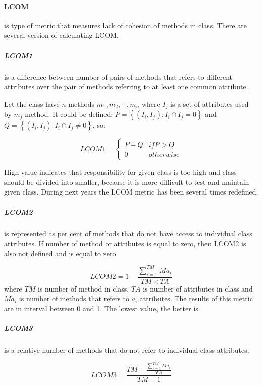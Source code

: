 \paragraph{\ac{LCOM}} is type of metric that measures lack of cohesion of methods in class. There are several version of calculating \ac{LCOM}.

\subparagraph*{LCOM1} is a difference between number of pairs of methods that refers to different attributes over the pair of methods referring to at least one common attribute. 

Let the class have $n$ methods $m_{1}, m_{2}, \cdots, m_{n}$ where $I_{j}$ is a set of attributes used by $m_{j}$ method. It could be defined: $P=\left\{ \left( { I }_{ i },{ I }_{ j } \right) :{ I }_{ i }\cap { I }_{ j }=0 \right\}$ and $Q=\left\{ \left( { I }_{ i },{ I }_{ j } \right) :{ I }_{ i }\cap { I }_{ j }\neq 0 \right\}$, so: 

\[LCOM1 = \left\{
  \begin{array}{lr}
    P-Q & if P>Q\\
    0 & otherwise
  \end{array}
\right.
\]

High value indicates that responsibility for given class is too high and class should be divided into smaller, because it is more difficult to test and maintain given class. During next years the \ac{LCOM} metric has been several times redefined. 

\subparagraph*{LCOM2} is represented as per cent of methods that do not have access to individual class attributes. If number of method or attributes is equal to zero, then LCOM2 is also not defined and is equal to zero. 

\begin{equation}
LCOM2=1-\frac { \sum _{ i=1 }^{ TM }{ { Ma }_{ i } }  }{ TM\times TA } 
\end{equation}
where $TM$ is number of method in class, $TA$ is number of attributes in class and $Ma_{i}$ is number of methods that refers to $a_{i}$ attributes. The results of this metric are in interval between 0 and 1. The lowest value, the better is. 

\subparagraph*{LCOM3} is a relative number of methods that do not refer to individual class attributes.

\begin{equation}
LCOM3=\frac { TM-\frac { \sum _{ i=1 }^{ TM }{ { Ma }_{ i } }  }{ TA }  }{ TM-1 } 
\end{equation}

